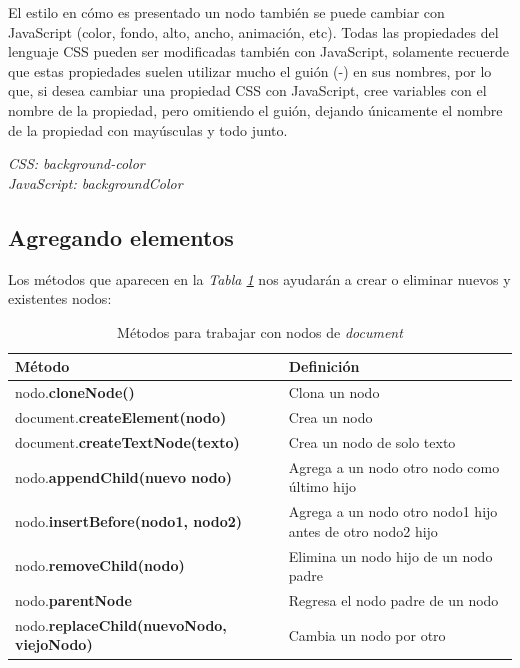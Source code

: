 El estilo en cómo es presentado un nodo también se puede cambiar con JavaScript (color, fondo, alto, ancho, animación, etc). Todas las propiedades del lenguaje CSS pueden ser modificadas también con JavaScript, solamente recuerde que estas propiedades suelen utilizar mucho el guión (-) en sus nombres, por lo que, si desea cambiar una propiedad CSS con JavaScript, cree variables con el nombre de la propiedad, pero omitiendo el guión, dejando únicamente el nombre de la propiedad con mayúsculas y todo junto.
\begin{center}
    \textit{CSS: background-color\\JavaScript: backgroundColor}
\end{center}


\subsection{Agregando elementos}
\hspace{0.55cm}Los métodos que aparecen en la \textit{Tabla \ref{tab: 10}} nos ayudarán a crear o eliminar nuevos y existentes nodos:
\begin{table}[H]
    \begin{center}
        \caption{Métodos para trabajar con nodos de \textit{document}}
        \label{tab: 10}
        \begin{tabular}{m{7cm} m{7cm}}
            \hline
            \textbf{Método} & \textbf{Definición} \\
            \hline
            nodo.\textbf{cloneNode()}                           & Clona un nodo \\
            document.\textbf{createElement(nodo)}               & Crea un nodo \\
            document.\textbf{createTextNode(texto)}             & Crea un nodo de solo texto \\
            nodo.\textbf{appendChild(nuevo nodo)}               & Agrega a un nodo otro nodo como último hijo \\
            nodo.\textbf{insertBefore(nodo1, nodo2)}            & Agrega a un nodo otro nodo1 hijo antes de otro nodo2 hijo \\
            nodo.\textbf{removeChild(nodo)}                     & Elimina un nodo hijo de un nodo padre \\
            nodo.\textbf{parentNode}                            & Regresa el nodo padre de un nodo \\
            nodo.\textbf{replaceChild(nuevoNodo, viejoNodo)}    & Cambia un nodo por otro \\
            \hline
        \end{tabular}
    \end{center}    
\end{table}

